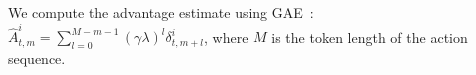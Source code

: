 We compute the advantage estimate using GAE~\citep{SchulmanMLJA15}: $\hat{A}_{t,m}^i = \sum_{l=0}^{M-m-1}(\gamma\lambda)^l\delta_{t,m+l}^i$, where $M$ is the token length of the action sequence.

